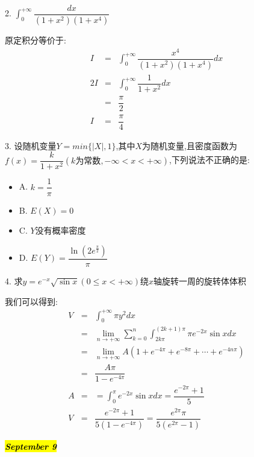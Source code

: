 2. $\int_{0}^{+\infty}\dfrac{dx}{(1+x^2)(1+x^4)}$

\begin{solution}

	原定积分等价于:  
	\begin{eqnarray*}
		I&=&\int_{0}^{+\infty}\dfrac{x^4}{(1+x^2)(1+x^4)}dx\\
		2I&=&\int_{0}^{+\infty}\dfrac{1}{1+x^2}dx\\
		&=&\dfrac{\pi}{2}\\
		I&=&\dfrac{\pi}{4}
	\end{eqnarray*}
\end{solution}

3. 设随机变量$Y=min\{|X|,1\}$,其中$X$为随机变量,且密度函数为$f(x)=\dfrac{k}{1+x^2}(k\text{为常数},-\infty<x<+\infty)$,下列说法不正确的是:  
\begin{itemize}
	\item A. $k=\dfrac{1}{\pi}$
	\item B. $E(X)=0$
	\item C. $Y$没有概率密度
	\item D. $E(Y)=\dfrac{\ln(2e^{\frac{\pi}{2}})}{\pi}$
\end{itemize}

\begin{solution}
	
\end{solution}

4. 求$y=e^{-x}\sqrt{\sin x}(0\leq x<+\infty)$绕$x$轴旋转一周的旋转体体积

\begin{solution}

	我们可以得到:  
	\begin{eqnarray*}
		V&=&\int_{0}^{+\infty}\pi y^2dx\\
		&=&\lim\limits_{n\rightarrow+\infty}\sum\limits_{k=0}^{n}\int_{2k\pi}^{(2k+1)\pi}\pi e^{-2x}\sin xdx\\
		&=&\lim\limits_{n\rightarrow+\infty}A(1+e^{-4\pi}+e^{-8\pi}+\cdots+e^{-4n\pi})\\
		&=&\dfrac{A\pi}{1-e^{-4\pi}}\\
		A&=&=\int_{0}^{\pi}e^{-2x}\sin xdx=\dfrac{e^{-2\pi}+1}{5}\\
		V&=&\dfrac{e^{-2\pi}+1}{5(1-e^{-4\pi})}=\dfrac{e^{2\pi}\pi}{5(e^{2\pi}-1)}
	\end{eqnarray*}
\end{solution}

\hl{\textbf{\textit{September 9}}}

